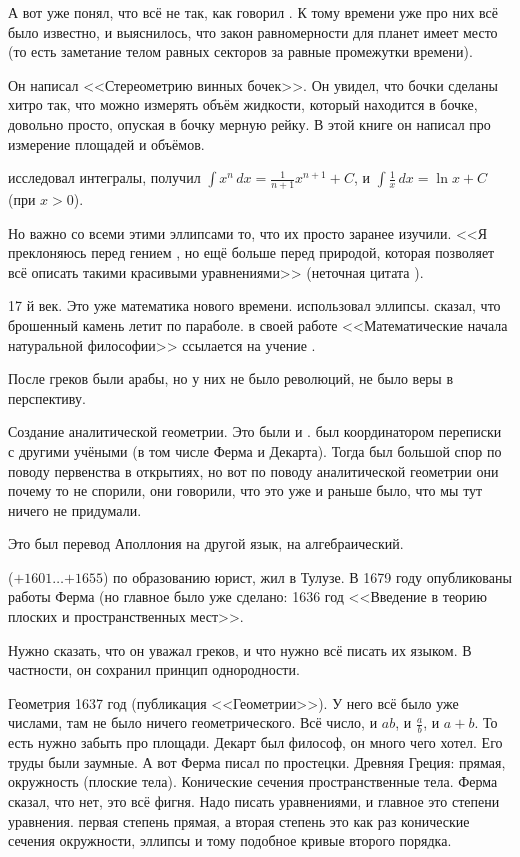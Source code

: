 \documentclass[a4paper,oneside,fleqn,10pt]{article}
\newcommand{\pe}[2]{${#1}\ldots{#2}$}
\begin{document}
А вот  уже понял, что всё не так, как говорил
.  К тому времени уже про них всё было известно, и
выяснилось, что закон равномерности для планет имеет место (то есть
заметание телом равных секторов за равные промежутки времени).

Он написал <<Стереометрию винных бочек>>. Он увидел, что бочки сделаны
хитро так, что можно измерять объём жидкости, который находится в
бочке, довольно просто, опуская в бочку мерную рейку.  В этой книге он
написал про измерение площадей и объёмов.

 исследовал интегралы, получил $\int x^n\,dx =
\frac{1}{n+1} x^{n+1} + C$, и $ \int \frac1x\,dx = \ln x + C$ (при $x
> 0$).

Но важно со всеми этими эллипсами то, что их просто заранее изучили.
<<Я преклоняюсь перед гением , но ещё больше
перед природой, которая позволяет всё описать такими красивыми
уравнениями>> (неточная цитата ).

17 й век. Это уже математика нового времени.  использовал
эллипсы.  сказал, что брошенный камень летит по
параболе.  в своей работе <<Математические начала
натуральной философии>> ссылается на учение
.

После греков были арабы, но у них не было революций, не было веры в
перспективу.

Создание аналитической геометрии. Это были  и
.   был координатором переписки с другими
учёными (в том числе Ферма и Декарта).  Тогда был большой спор по
поводу первенства в открытиях, но вот по поводу аналитической
геометрии они почему то не спорили, они говорили, что это уже и раньше
было, что мы тут ничего не придумали.

Это был перевод Аполлония на другой язык, на алгебраический.

 (\pe{+1601}{+1655}) по образованию
юрист, жил в Тулузе.  В 1679 году опубликованы работы Ферма (но
главное было уже сделано: 1636 год <<Введение в теорию плоских и
пространственных мест>>.

Нужно сказать, что он уважал греков, и что нужно всё писать их языком.
В частности, он сохранил принцип однородности.

Геометрия  1637 год (публикация <<Геометрии>>).
У него всё было уже числами, там не было ничего геометрического.  Всё
число, и $ab$, и $\frac ab$, и $a+b$. То есть нужно забыть про
площади.  Декарт был философ, он много чего хотел. Его труды были
заумные.  А вот Ферма писал по простецки. Древняя Греция: прямая,
окружность (плоские тела).  Конические сечения пространственные
тела. Ферма сказал, что нет, это всё фигня. Надо писать уравнениями, и
главное это степени уравнения.  первая степень прямая, а вторая
степень это как раз конические сечения окружности, эллипсы и тому
подобное кривые второго порядка.
\end{document}
